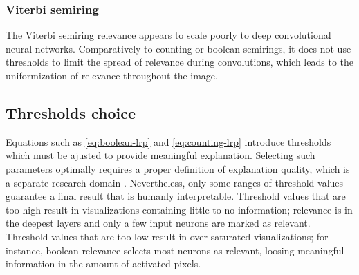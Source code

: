 \documentclass[twocolumn]{../cs-classes/cs-classes}
\newcommand*{\1}{\digitsbb{1}}
\newcommand*{\0}{\digitsbb{0}}
\begin{document}
\subsubsection{Viterbi semiring}
The Viterbi semiring relevance appears to scale poorly to deep convolutional neural networks. Comparatively to counting or boolean semirings, it does not use thresholds to limit the spread of relevance during convolutions, which leads to the uniformization of relevance throughout the image.


\subsection{Thresholds choice}
\label{sec:thresholds-choice}
Equations such as \ref{eq:boolean-lrp} and \ref{eq:counting-lrp} introduce thresholds which must be ajusted to provide meaningful explanation. Selecting such parameters optimally requires a proper definition of explanation quality, which is a separate research domain \cite{samek2016evaluating}. Nevertheless, only some ranges of threshold values guarantee a final result that is humanly interpretable. Threshold values that are too high result in visualizations containing little to no information; relevance is  in the deepest layers and only a few input neurons are marked as relevant. Threshold values that are too low result in over-saturated visualizations; for instance, boolean relevance selects most neurons as relevant, loosing meaningful information in the amount of activated pixels.
\end{document}
